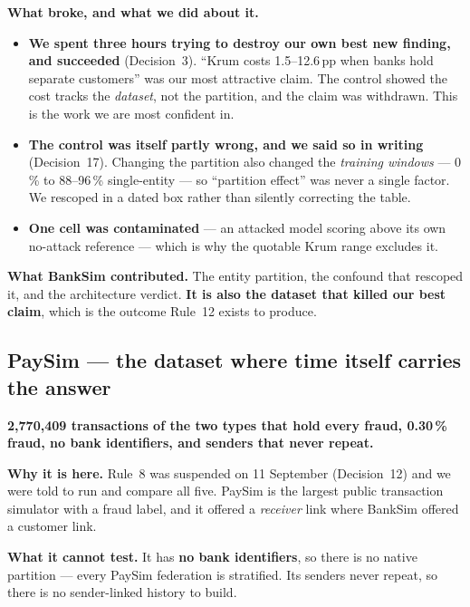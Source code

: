 \documentclass[11pt]{article}
\begin{document}
\textbf{What broke, and what we did about it.}
\begin{itemize}\itemsep2pt
  \item \textbf{We spent three hours trying to destroy our own best new finding, and succeeded}
        (Decision~3). ``Krum costs 1.5--12.6\,pp when banks hold separate customers'' was our most
        attractive claim. The control showed the cost tracks the \emph{dataset}, not the partition, and
        the claim was withdrawn. This is the work we are most confident in.
  \item \textbf{The control was itself partly wrong, and we said so in writing} (Decision~17). Changing
        the partition also changed the \emph{training windows} --- 0\,\% to 88--96\,\% single-entity --- so
        ``partition effect'' was never a single factor. We rescoped in a dated box rather than silently
        correcting the table.
  \item \textbf{One cell was contaminated} --- an attacked model scoring above its own no-attack reference
        --- which is why the quotable Krum range excludes it.
\end{itemize}

\textbf{What BankSim contributed.} The entity partition, the confound that rescoped it, and the
architecture verdict. \textbf{It is also the dataset that killed our best claim}, which is the outcome
Rule~12 exists to produce.

\subsection{PaySim --- the dataset where time itself carries the answer}

\textbf{2{,}770{,}409 transactions of the two types that hold every fraud, 0.30\,\% fraud, no bank
identifiers, and senders that never repeat.}

\textbf{Why it is here.} Rule~8 was suspended on 11 September (Decision~12) and we were told to run and
compare all five. PaySim is the largest public transaction simulator with a fraud label, and it offered a
\emph{receiver} link where BankSim offered a customer link.

\textbf{What it cannot test.} It has \textbf{no bank identifiers}, so there is no native partition ---
every PaySim federation is stratified. Its senders never repeat, so there is no sender-linked history to
build.
\end{document}
